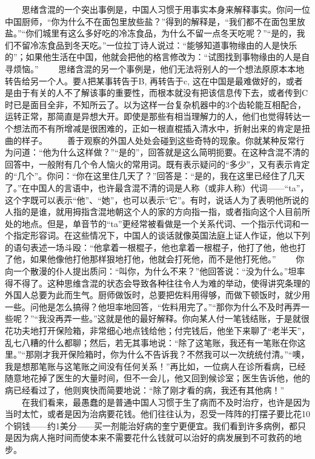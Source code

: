 \documentclass[12pt,oneside]{book}
\begin{document}
\begin{common-format}
　　思绪含混的一个突出事例是，中国人习惯于用事实本身来解释事实。你问一位中国厨师，“你为什么不在面包里放些盐？”得到的解释是，“我们都不在面包里放盐。”“你们城里有这么多好吃的冷冻食品，为什么不留一点冬天吃呢？”“是的，我们不留冷冻食品到冬天吃。”一位拉丁诗人说过：“能够知道事物缘由的人是快乐的”；如果他生活在中国，他就会把他的格言修改为：“试图找到事物缘由的人是自寻烦恼。” 
　　思绪含混的另一个事例是，他们无法将别人的一个想法原原本本地转告给另一个人。要A把某事转告于B, 再转告于c, 这在中国是最难做好的，或者是由于有关的人不了解该事的重要性，而根本就没有把该信息传下去，或者传到C时已是面目全非，不知所云了。以为这样一台复杂机器中的3个齿轮能互相配合，运转正常，那简直是异想大开。即使是那些有相当理解力的人，他们也觉得转达一个想法而不有所增减是很困难的，正如一根直棍插入清水中，折射出来的肯定是扭曲的样子。 
　　善于观察的外国人处处会碰到这些奇特的现象。你就某种反常行为问道：“他为什么这样做？”“是的”，回答就是这么简明扼要。在这种含混不清的回答中，一般附有几个令人恼火的常用词。既有表示疑问的“多少”，又有表示肯定的“几个”。你问：“你在这里住几天了？”回答是：“是的，我在这里已经住了几天了。”在中国人的言语中，也许最含混不清的词是人称（或非人称）代词——“ta”，这个字既可以表示“他”、“她”，也可以表示“它”。有时，说话人为了表明他所说的人指的是谁，就用拇指含混地朝这个人的家的方向指一指，或者指向这个人目前所处的地点。但是，单音节的“ta”更经常被看做是一个关系代词、一个指示代词和一个指定形容词。在这些情况下，中国人的谈话就像英国法庭上证人作证，他以下列的语句表述一场斗殴：“他拿着一根棍子，他也拿着一根棍子，他打了他，他也打了他，如果他像他打他那样狠地打他，他就会打死他，而不是他打死他。” 
　　你向一个散漫的仆人提出质问：“叫你，为什么不来？”他回答说：“没为什么。”坦率得不得了。这种思维含混的状态会导致各种往往令人为难的举动，使得讲究条理的外国人总要为此而生气。厨师做饭时，总要把佐料用得够，而做下顿饭时，就少用一些。问他是怎么搞得？他坦率地回答，“佐料用完了。”“那你为什么不及时再弄一些呢？”“我没再弄一些。”这就是他的最好解释。你向某人付一笔钱结账，于是就很花功夫地打开保险箱，非常细心地点钱给他；付完钱后，他坐下来聊了“老半天”，乱七八糟的什么都聊；然后，若无其事地说：“除了这笔账，我还有一笔账在你这里。”“那刚才我开保险箱时，你为什么不告诉我？不然我可以一次统统付清。”“噢，我是想那笔账与这笔账之间没有任何关系！”再比如，一位病人在诊所看病，已经随意地花掉了医生的大量时间，但不一会儿，他又回到候诊室；医生告诉他，他的病已经看过了，他则爽快而简要地说：“除了刚才看的病，我还有其他病！” 
　　在我们看来，最愚蠢的是普通中国人习惯于生了病而不及时治疗，也许是因为当时太忙，或者是因为治病要花钱。他们往往认为，忍受一阵阵的打摆子要比花10个铜钱——约1美分——买一剂能治好病的奎宁更便宜。我们看到许多病例，都只是因为病人拖时间而使本来不需要花什么钱就可以治好的病发展到不可救药的地步。 

\end{common-format}
\end{document}
